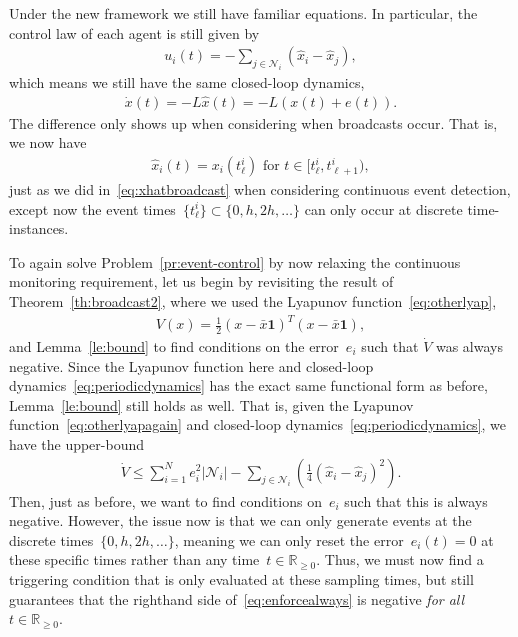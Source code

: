 \documentclass{autart}
\newtheorem{problem}[theorem]{Problem}
\newcommand{\realnonnegative}{\mathbb{R}_{\ge 0}}
\newcommand{\integernonnegative}{\mathbb{Z}_{\ge 0}}
\newcommand{\GG}{{\mathcal{G}}}
\newcommand{\NN}{{\mathcal{N}}}
\newcommand{\commgraph}{\GG_\text{comm}}
\renewcommand{\hat}{\widehat}
\newcommand{\longthmtitle}[1]{\mbox{}\textup{\textbf{(#1)}}}
\begin{document}
Under the new framework we still have familiar equations. In
particular, the control law of each agent is still given by
\begin{align}\label{eq:periodiccontrol}
  u_i(t) = - \sum_{j \in \NN_i} (\hat{x}_i - \hat{x}_j),
\end{align}
which means we still have the same closed-loop dynamics,
\begin{align}\label{eq:periodicdynamics}
  \dot{x}(t) = -L \hat{x}(t) = - L(x(t) + e(t)).
\end{align}
The difference only shows up when considering when broadcasts
occur. That is, we now have
\begin{align}\label{eq:xhatperiodic}
  \hat{x}_i(t) = x_i(t_\ell^i) \text{ for } t \in [t_\ell^i, t_{\ell+1}^i),
\end{align}
just as we did in~\eqref{eq:xhatbroadcast} when considering continuous
event detection, except now the event
times~$\{t_\ell^i\} \subset \{0, h, 2h, \dots \}$ can only occur at
discrete time-instances.
%

{To again solve Problem~\ref{pr:event-control} by now relaxing
  the continuous monitoring requirement, let us begin by revisiting
  the result of Theorem~\ref{th:broadcast2}, where we used the
  Lyapunov function~\eqref{eq:otherlyap},}
\begin{align}\label{eq:otherlyapagain}
  V(x) = \frac{1}{2} (x - \bar{x} \mathbf{1})^T (x - \bar{x}
  \mathbf{1}) ,
\end{align}
and Lemma~\ref{le:bound} to find conditions on the error~$e_i$ such
that $\dot{V}$ was always negative. Since the Lyapunov function here
and closed-loop dynamics~\eqref{eq:periodicdynamics} has the exact
same functional form as before, Lemma~\ref{le:bound} still holds as
well. That is, given the Lyapunov function~\eqref{eq:otherlyapagain}
and closed-loop dynamics~\eqref{eq:periodicdynamics}, we have the
upper-bound
\begin{align}\label{eq:enforcealways}
  \dot{V} \leq \sum_{i=1}^N e_i^2 |\NN_i| - \sum_{j \in \NN_i} \left(
  \frac{1}{4} (\hat{x}_i - \hat{x}_j)^2 \right) . 
\end{align}
Then, just as before, we want to find conditions on~$e_i$ such that
this is always negative.  However, the issue now is that we can only
generate events at the discrete times~$\{0, h, 2h, \dots\}$, meaning
we can only reset the error~$e_i(t) = 0$ at these specific times
rather than any time~$t \in \realnonnegative$. Thus, we must now find
a triggering condition that is only evaluated at these sampling times,
but still guarantees that the righthand side
of~\eqref{eq:enforcealways} is negative \emph{for all $t \in
  \realnonnegative$}.
\end{document}
